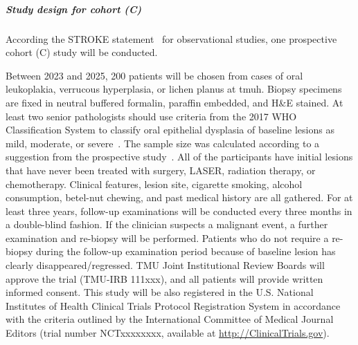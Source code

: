 \documentclass[12pt, a4paper]{article}
\begin{document}
\subparagraph*{Study design for cohort (C)}
According the STROKE statement~\citep{VonElm2008} for observational studies, one prospective cohort (C) study will be conducted.



Between 2023 and 2025, 200 patients will be chosen from cases of oral leukoplakia, verrucous hyperplasia, or lichen planus at \acrshort{tmuh}. Biopsy specimens are fixed in neutral buffered formalin, paraffin embedded, and H\&E stained. At least two senior pathologists should use criteria from the 2017 WHO Classification System to classify oral epithelial dysplasia of baseline lesions as mild, moderate, or severe~\cite{Gale2005, Ranganathan2019}. The sample size was calculated according to a suggestion from the prospective study~\cite{Cao2009}.
All of the participants have initial lesions that have never been treated with surgery, LASER, radiation therapy, or chemotherapy. Clinical features, lesion site, cigarette smoking, alcohol consumption, betel-nut chewing, and past medical history are all gathered. For at least three years, follow-up examinations will be conducted every three months in a double-blind fashion. If the clinician suspects a malignant event, a further examination and re-biopsy will be performed. Patients who do not require a re-biopsy during the follow-up examination period because of baseline lesion has clearly disappeared/regressed. TMU Joint Institutional Review Boards will approve the trial (TMU-IRB 111xxx), and all patients will provide written informed consent. This study will be also registered in the U.S. National Institutes of Health Clinical Trials Protocol Registration System in accordance with the criteria outlined by the International Committee of Medical Journal Editors (trial number NCTxxxxxxxx, available at \url{http://ClinicalTrials.gov}).
\end{document}
